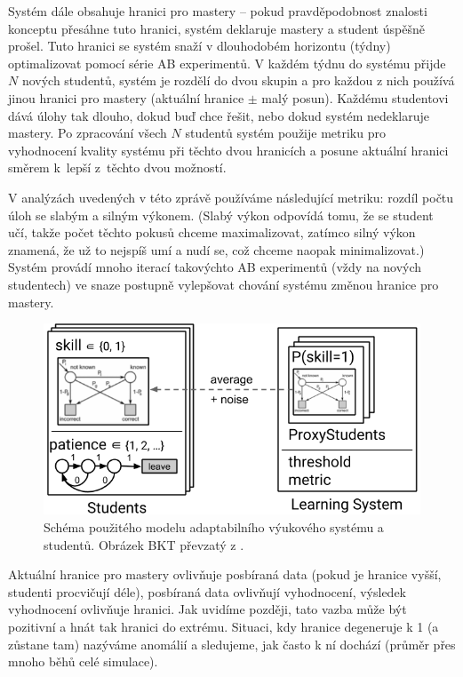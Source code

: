 \documentclass[twocolumn,10pt,cleanfoot]{asme2ej}
\begin{document}
Systém dále obsahuje hranici pro mastery -- pokud pravděpodobnost znalosti konceptu přesáhne tuto hranici, systém deklaruje mastery a student úspěšně prošel. Tuto hranici se systém snaží v dlouhodobém horizontu (týdny) optimalizovat pomocí série AB experimentů. V každém týdnu do systému přijde $N$ nových studentů, systém je rozdělí do dvou skupin a pro každou z nich používá jinou hranici pro mastery (aktuální hranice $\pm$ malý posun). Každému studentovi dává úlohy tak dlouho, dokud buď chce řešit, nebo dokud systém nedeklaruje mastery. Po zpracování všech $N$ studentů systém použije metriku pro vyhodnocení kvality systému při těchto dvou hranicích a posune aktuální hranici směrem k~lepší z~těchto dvou možností.

\clearpage
V analýzách uvedených v této zprávě používáme následující metriku: rozdíl počtu úloh se slabým a silným výkonem. (Slabý výkon odpovídá tomu, že se student učí, takže počet těchto pokusů chceme maximalizovat, zatímco silný výkon znamená, že už to nejspíš umí a nudí se, což chceme naopak minimalizovat.) Systém provádí mnoho iterací takovýchto AB experimentů (vždy na nových studentech) ve snaze postupně vylepšovat chování systému změnou hranice pro mastery.

\begin{figure}[htb]
\centering
\includegraphics[width=\columnwidth]{img/model}
\caption{Schéma použitého modelu adaptabilního výukového systému a studentů.
  Obrázek BKT převzatý z \cite{bkt-logistic-overview}.}
\label{fig:model}
\end{figure}

Aktuální hranice pro mastery ovlivňuje posbíraná data (pokud je hranice vyšší, studenti procvičují déle), posbíraná data ovlivňují vyhodnocení, výsledek vyhodnocení ovlivňuje hranici. Jak uvidíme později, tato vazba může být pozitivní a hnát tak hranici do extrému. Situaci, kdy hranice degeneruje k 1 (a zůstane tam) nazýváme anomálií a sledujeme, jak často k ní dochází (průměr přes mnoho běhů celé simulace).
\end{document}
